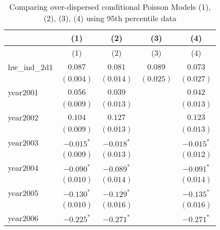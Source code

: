 
\begin{center}
\begin{longtable}{l c c c c}
\caption{Comparing over-dispersed conditional Poisson Models (1), (2), (3), (4) using 95th percentile data}
\label{all_gnm_models_95th_perct}\\
\hline
 & (1) & (2) & (3) & (4) \\
\hline
\endfirsthead
\hline
 & (1) & (2) & (3) & (4) \\
\hline
\endhead
\hline
\endfoot
\hline
\endlastfoot
hw\_ind\_2d1             & $0.087$               & $0.081$               & $0.089$               & $0.073$               \\
                         & $(0.004)$             & $(0.014)$             & $(0.025)$             & $(0.027)$             \\
year2001                 & $0.056$               & $0.039$               &                       & $0.042$               \\
                         & $(0.009)$             & $(0.013)$             &                       & $(0.013)$             \\
year2002                 & $0.104$               & $0.127$               &                       & $0.123$               \\
                         & $(0.009)$             & $(0.013)$             &                       & $(0.013)$             \\
year2003                 & $\mathbf{-0.015}^{*}$ & $\mathbf{-0.018}^{*}$ &                       & $\mathbf{-0.015}^{*}$ \\
                         & $(0.009)$             & $(0.013)$             &                       & $(0.012)$             \\
year2004                 & $\mathbf{-0.090}^{*}$ & $\mathbf{-0.089}^{*}$ &                       & $\mathbf{-0.091}^{*}$ \\
                         & $(0.010)$             & $(0.014)$             &                       & $(0.014)$             \\
year2005                 & $\mathbf{-0.130}^{*}$ & $\mathbf{-0.129}^{*}$ &                       & $\mathbf{-0.135}^{*}$ \\
                         & $(0.010)$             & $(0.016)$             &                       & $(0.016)$             \\
year2006                 & $\mathbf{-0.225}^{*}$ & $\mathbf{-0.271}^{*}$ &                       & $\mathbf{-0.271}^{*}$ \\

\end{longtable}
\end{center}
